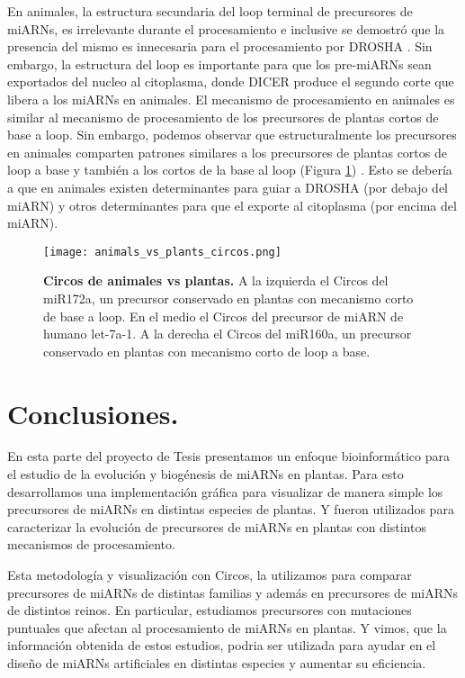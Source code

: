 En animales, la estructura secundaria del loop terminal de precursores de miARNs, es irrelevante durante el procesamiento e inclusive se demostró que la presencia del mismo es innecesaria para el procesamiento por DROSHA \citep{pmid16751099}.
Sin embargo, la estructura del loop es importante para que los pre-miARNs sean exportados del nucleo al citoplasma, donde DICER produce el segundo corte que libera a los miARNs en animales.
El mecanismo de procesamiento en animales es similar al mecanismo de procesamiento de los precursores de plantas cortos de base a loop.
Sin embargo, podemos observar que estructuralmente los precursores en animales comparten patrones similares a los precursores de plantas cortos de loop a base y también a los cortos de la base al loop (Figura \ref{fig:animals_vs_plants_circos}) .
Esto se debería a que en animales existen determinantes para guiar a DROSHA (por debajo del miARN) y otros determinantes para que el exporte al citoplasma (por encima del miARN).

\begin{landscape} 
\begin{figure}[htbp!] 
        \centering    
        \texttt{[image: animals\_vs\_plants\_circos.png]}
        \caption[Circos de animales vs plantas]{
        \textbf{Circos de animales vs plantas.}
		A la izquierda el Circos del miR172a, un precursor conservado en plantas con mecanismo corto de base a loop.
		En el medio el Circos del precursor de miARN de humano let-7a-1.
		A la derecha el Circos del miR160a, un precursor conservado en plantas con mecanismo corto de loop a base.
        }
	 \label{fig:animals_vs_plants_circos}
    \end{figure}
\end{landscape}


\section{Conclusiones.}
En esta parte del proyecto de Tesis presentamos un enfoque bioinformático para el estudio de la evolución y biogénesis de miARNs en plantas.
Para esto desarrollamos una implementación gráfica para visualizar de manera simple los precursores de miARNs en distintas especies de plantas.
Y fueron utilizados para caracterizar la evolución de precursores de miARNs en plantas con distintos mecanismos de procesamiento.

Esta metodología y visualización con Circos, la utilizamos para comparar precursores de miARNs de distintas familias y además en precursores de miARNs de distintos reinos.
En particular, estudiamos precursores con mutaciones puntuales que afectan al procesamiento de miARNs en plantas.
Y vimos, que la información obtenida de estos estudios, podria ser utilizada para ayudar en el diseño de miARNs artificiales en distintas especies y aumentar su eficiencia.

